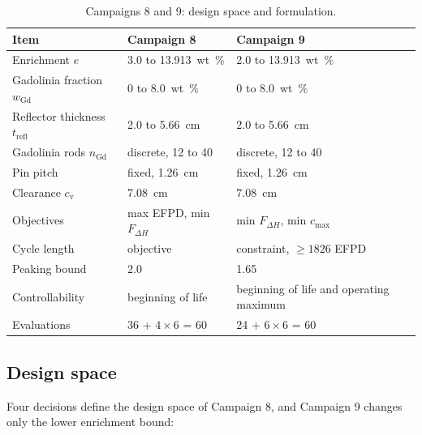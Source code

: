 \begin{table}[htbp]
  \centering
  \small
  \caption{Campaigns 8 and 9: design space and formulation.}
  \label{tab:c89-spec}
  \begin{tabular}{@{}l l l@{}}
    \toprule
    Item & Campaign 8 & Campaign 9 \\
    \midrule
    Enrichment $e$                 & 3.0 to \SI{13.913}{wt\%} & 2.0 to \SI{13.913}{wt\%} \\
    Gadolinia fraction $w_\mathrm{Gd}$ & 0 to \SI{8.0}{wt\%}  & 0 to \SI{8.0}{wt\%} \\
    Reflector thickness $t_\mathrm{refl}$ & 2.0 to \SI{5.66}{cm} & 2.0 to \SI{5.66}{cm} \\
    Gadolinia rods $n_\mathrm{Gd}$ & discrete, 12 to 40     & discrete, 12 to 40 \\
    Pin pitch                      & fixed, \SI{1.26}{cm}   & fixed, \SI{1.26}{cm} \\
    Clearance $c_\mathrm{v}$       & \SI{7.08}{cm}          & \SI{7.08}{cm} \\
    \midrule
    Objectives                     & max EFPD, min $F_{\Delta H}$ & min $F_{\Delta H}$, min $c_\mathrm{max}$ \\
    Cycle length                   & objective              & constraint, $\ge 1826$ EFPD \\
    Peaking bound                  & 2.0                    & 1.65 \\
    Controllability                & beginning of life      & beginning of life and operating maximum \\
    \midrule
    Evaluations                    & 36 + $4\times6$ = 60   & 24 + $6\times6$ = 60 \\
    \bottomrule
  \end{tabular}
\end{table}

\subsection{Design space}

Four decisions define the design space of Campaign 8, and Campaign 9
changes only the lower enrichment bound:

